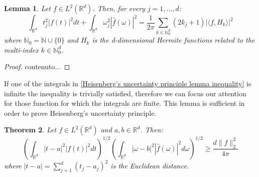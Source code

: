 \documentclass[corpo=11pt, stile=classica, tipotesi=custom,
greek, evenboxes, english]{toptesi}
\numberwithin{equation}{chapter}
\newtheorem{teo}{Theorem}[chapter] %
\newtheorem{lem}[teo]{Lemma}
\theoremstyle{remark}
\newcommand{\R}{\mathbb{R}} %
\newcommand{\N}{\mathbb{N}} %
\begin{document}
\begin{lem}\label{Heisenberg's uncertainty principle lemma d dimensions}
	Let $f \in L^2(\R^d)$. Then, for every $j = 1,\ldots,d$:
	\begin{equation}\label{Heisenberg's uncertainty principle lemma d dimensions formula}
		\int_{\R^d} t_j^2 |f(t)|^2 dt + \int_{\R^d} \omega_j^2 |\hat{f}(\omega)|^2 = \dfrac{1}{2\pi} \sum_{k \in \N_0^d} (2k_j + 1) |\langle f, H_k \rangle|^2
	\end{equation}
	where $\N_0 = \N \cup \{0\}$ and $H_k$ is the d-dimensional Hermite functions related to the multi-index $k \in \N_0^d$.
\end{lem}
\begin{proof}
	contenuto...
\end{proof}
{\color{red}If one of the integrals in \eqref{Heisenberg's uncertainty principle lemma inequality} is infinite the inequality is trivially satisfied, therefore we can focus our attention for those function for which the integrals are finite}. This lemma is sufficient in order to prove Heisenberg's uncertainty principle.
\begin{teo}\label{Heisenberg's uncertainty principle theorem}
	Let $f \in L^2(\R^d)$ and $a,b \in \R^d$. Then:
	\begin{equation}\label{Heisenberg's uncertainty principle formula}
		\left( \int_{\R^d} |t-a|^2 |f(t)|^2dt \right)^{1/2} \left( \int_{\R^d} |\omega - b|^2 |\hat{f}(\omega)|^2 d\omega \right)^{1/2} \geq \dfrac{d\|f\|_2^2}{4\pi}
	\end{equation}
	where $|t-a| = \sum_{j=1}^{d}(t_j - a_j)^2$ is the Euclidean distance.
\end{teo}
\end{document}
